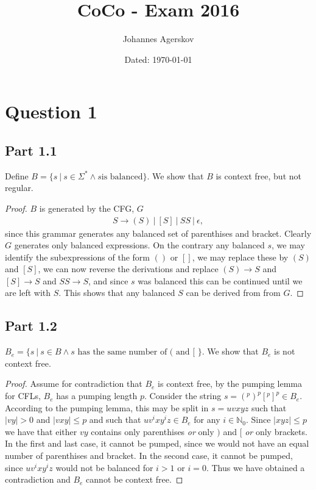 \documentclass[a4paper,11pt]{article}
\author{Johannes Agerskov}
\date{Dated: \today}
\title{CoCo - Exam 2016}
\newcommand{\abs}[1]{\left\lvert #1 \right\rvert}
\newcommand{\N}{\mathbb{N}}
\newcommand{\pipe}{\ \vert \ }
\numberwithin{equation}{section}
\begin{document}
	
	\maketitle
	\section*{Question 1}
	\subsection*{Part 1.1}
	Define $ B=\{s\pipe s\in \Sigma^*\wedge s\text{is balanced}\} $. We show that $ B $ is context free, but not regular.\begin{proof}
		$ B $ is generated by the CFG, $ G $\begin{equation}
		\begin{aligned}
		S\to (S)\pipe [S]\pipe SS\pipe
		\epsilon,
		\end{aligned}
		\end{equation}
		since this grammar generates any balanced set of parenthises and bracket. Clearly $ G $ generates only balanced expressions. On the contrary any balanced $ s $, we may identify the subexpressions of the form $ () $ or $ [] $, we may replace these by $ (S) $ and $ [S] $, we can now reverse the derivations and replace $ (S)\to S $ and $ [S]\to S $ and $ SS\to S $, and since $ s $ was balanced this can be continued until we are left with $ S $. This shows that any balanced $ S $ can be derived from from $ G $.   
	\end{proof}
	\subsection*{Part 1.2}
	$ B_e=\{s\pipe s\in B\wedge s\text{ has the same number of ( and [ }\} $.
	We show that $ B_e $ is not context free. \begin{proof}
		Assume for contradiction that $ B_e $ is context free, by the pumping lemma for CFLs, $ B_e $ has a pumping length $ p $. Consider the string $s= (^p)^p[^p]^p\in B_e $. According to the pumping lemma, this may be split in $ s=uvxyz $ such that $ \abs{vy}>0 $ and $ \abs{vxy}\leq p $ and such that $ uv^ixy^iz\in B_e $ for any $ i\in \N_0 $. Since $ \abs{xyz}\leq p $ we have that either $ vy $ contains only parenthises \emph{or} only $ ) $ and $ [ $ \emph{or} only brackets. In the first and last case, it cannot be pumped, since we would not have an equal number of parenthises and bracket. In the second case, it cannot be pumped, since $ uv^ixy^iz $ would not be balanced for $ i>1 $ or $ i=0 $. Thus we have obtained a contradiction and $ B_e $ cannot be context free.
	\end{proof}
	
\end{document}
